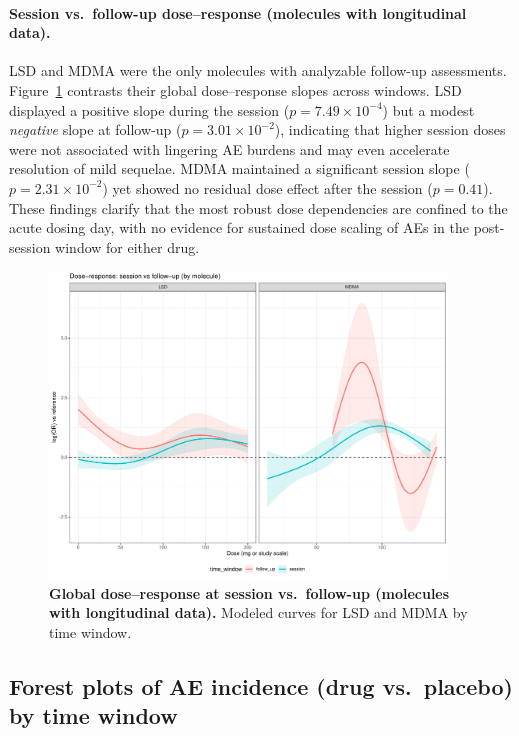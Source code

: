 \paragraph{Session vs.\ follow-up dose–response (molecules with longitudinal data).}
LSD and MDMA were the only molecules with analyzable follow-up assessments.
Figure~\ref{fig:dr-session-followup} contrasts their global dose–response slopes across windows.
LSD displayed a positive slope during the session ($p=7.49\times10^{-4}$) but a modest \emph{negative} slope at follow-up ($p=3.01\times10^{-2}$), indicating that higher session doses were not associated with lingering AE burdens and may even accelerate resolution of mild sequelae.
MDMA maintained a significant session slope ($p=2.31\times10^{-2}$) yet showed no residual dose effect after the session ($p=0.41$).
These findings clarify that the most robust dose dependencies are confined to the acute dosing day, with no evidence for sustained dose scaling of AEs in the post-session window for either drug.

\begin{figure}[htb]
  \centering
  \includegraphics[width=0.94\textwidth]{figures/dr_session_vs_followup.pdf}
  \caption{\textbf{Global dose–response at session vs.\ follow-up (molecules with longitudinal data).}
  Modeled curves for LSD and MDMA by time window.}
  \label{fig:dr-session-followup}
\end{figure}


\subsection{Forest plots of AE incidence (drug vs.\ placebo) by time window}


